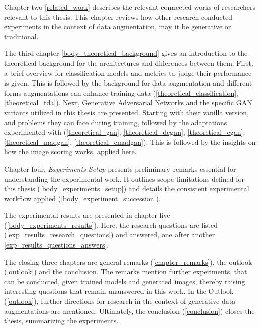 Chapter two \ref{related_work} describes the relevant connected works of researchers relevant to this thesis. This chapter reviews how other research conducted experiments in the context of data augmentation, may it be generative or traditional.  

The third chapter \ref{body_theoretical_background} gives an introduction to the theoretical background for the architectures and differences between them. First, a brief overview for classification models and metrics to judge their performance is given. This is followed by the background for data augmentation and different forms augmentations can enhance training data (\ref{theoretical_classification}, \ref{theoretical_tda}). Next, Generative Adversarial Networks and the specific GAN variants utilized in this thesis are presented. Starting with their vanilla version, and problems they can face during training, followed by the adaptations experimented with (\ref{theoretical_gan}, \ref{theoretical_dcgan}, \ref{theoretical_cgan}, \ref{theoretical_madgan}, \ref{theoretical_cmadgan}). This is followed by the insights on how the image scoring works, applied here. 

Chapter four, \textit{Experiments Setup} presents preliminary remarks essential for understanding the experimental work. It outlines scope limitations defined for this thesis (\ref{body_experiments_setup}) and details the consistent experimental workflow applied (\ref{body_experiment_succession}). 

The experimental results are presented in chapter five (\ref{body_experiments_results}). Here, the research questions are listed (\ref{exp_results_research_questions}) and answered, one after another \ref{exp_results_questions_answers}. 

The closing three chapters are general remarks (\ref{chapter_remarks}), the outlook (\ref{outlook}) and the conclusion. The remarks mention further experiments, that can be conducted, given trained models and generated images, thereby raising interesting questions that remain unanswered in this work. In the Outlook (\ref{outlook}), further directions for research in the context of generative data augmentations are mentioned. Ultimately, the conclusion (\ref{conclusion}) closes the thesis, summarizing the experiments. 

\newpage
